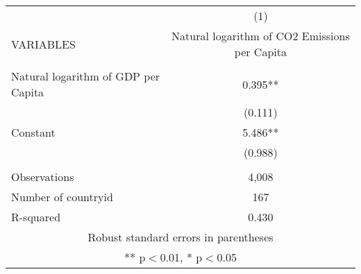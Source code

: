 \begin{tabular}{lc} \hline
 & (1) \\
VARIABLES & Natural logarithm of CO2 Emissions per Capita \\ \hline
 &  \\
Natural logarithm of GDP per Capita & 0.395** \\
 & (0.111) \\
Constant & 5.486** \\
 & (0.988) \\
 &  \\
Observations & 4,008 \\
Number of countryid & 167 \\
 R-squared & 0.430 \\ \hline
\multicolumn{2}{c}{ Robust standard errors in parentheses} \\
\multicolumn{2}{c}{ ** p$<$0.01, * p$<$0.05} \\
\end{tabular}
